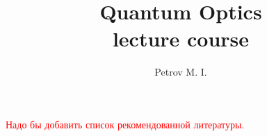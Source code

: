 \documentclass[12pt,a4paper,titlepage]{article}
\date{ }
\author{Petrov M. I.}
\title{\textbf{Quantum Optics} \\ lecture course}
\numberwithin{equation}{section}
\begin{document}
	
	\maketitle
	\newpage
	
	\renewcommand\contentsname{Contents} 
	\tableofcontents
\newpage
	\begin{otherlanguage}{russian}	
		\textcolor{red}{Надо бы добавить список рекомендованной литературы.}
	\end{otherlanguage}

	
	
	

	
	
	
	
	
	
	
	
	
	
	
	
	
	
\end{document}

